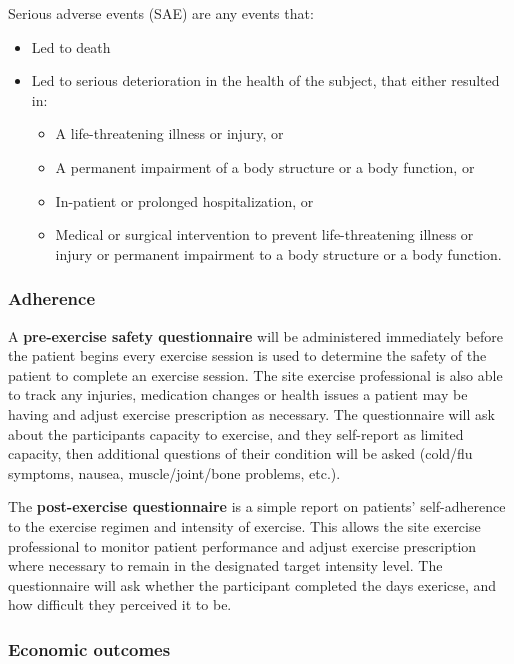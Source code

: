 \documentclass[
]{article}
\providecommand{\tightlist}{%
  \setlength{\itemsep}{0pt}\setlength{\parskip}{0pt}}
\begin{document}
Serious adverse events (SAE) are any events that:
\begin{itemize}\tightlist
  \item Led to death
  \item Led to serious deterioration in the health of the subject, that either resulted in:
  \begin{itemize}\tightlist
    \item A life-threatening illness or injury, or
    \item A permanent impairment of a body structure or a body function, or
    \item In-patient or prolonged hospitalization, or
    \item Medical or surgical intervention to prevent life-threatening illness or injury or permanent impairment to a body structure or a body function.
  \end{itemize}
\end{itemize}

\hypertarget{adherence-outcomes}{
  \subsubsection{Adherence}\label{adherence-outcomes}}
  
A \textbf{pre-exercise safety questionnaire} will be administered immediately before the patient begins every exercise session is used to determine the safety of the patient to complete an exercise session. The site exercise professional is also able to track any injuries, medication changes or health issues a patient may be having and adjust exercise prescription as necessary.
The questionnaire will ask about the participants capacity to exercise, and they self-report as limited capacity, then additional questions of their condition will be asked (cold/flu symptoms, nausea, muscle/joint/bone problems, etc.).

The \textbf{post-exercise questionnaire} is a simple report on patients’ self-adherence to the exercise regimen and intensity of exercise. This allows the site exercise professional to monitor patient performance and adjust exercise prescription where necessary to remain in the designated target intensity level.
The questionnaire will ask whether the participant completed the days exericse, and how difficult they perceived it to be.

\hypertarget{economic-outcomes}{
  \subsubsection{Economic outcomes}\label{economic-outcomes}}
\end{document}
